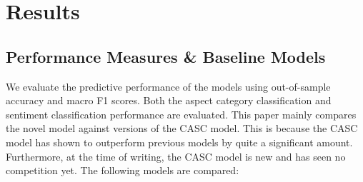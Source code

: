 \documentclass[american, oneside]{ecsgdp}
\begin{document}

\chapter{Results} \label{chap:results}

\section{Performance Measures \& Baseline Models} \label{sec:baselines}
We evaluate the predictive performance of the models using out-of-sample accuracy and macro F1 scores. Both the aspect category classification and sentiment classification performance are evaluated. This paper mainly compares the novel model against versions of the CASC model. This is because the CASC model has shown to outperform previous models by quite a significant amount. Furthermore, at the time of writing, the CASC model is new and has seen no competition yet. The following models are compared:
\end{document}
